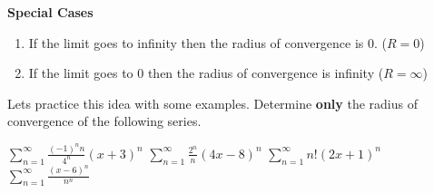 \documentclass[addpoints]{exam}
\begin{document}
\begin{tcolorbox}[title= RADIUS OF CONVERGENCE (CONT),colframe=black,sharp corners,colback=white,colbacktitle=white,coltitle=black]
    \large \textbf{Special Cases} \normalsize
    \begin{enumerate}
        \item If the limit goes to infinity then the radius of convergence is 0. (\(R=0\))
        \item If the limit goes to 0 then the radius of convergence is infinity (\(R=\infty\))
    \end{enumerate}
\end{tcolorbox}

Lets practice this idea with some examples. Determine \textbf{only} the radius of convergence of the following series. 
\begin{questions}
    \question \(\displaystyle
    \sum\limits_{n = 1}^\infty  {\frac{{{{\left( { - 1} \right)}^n}n}}{{{4^n}}}{{\left( {x + 3} \right)}^n}}
    \)
    \question \(\displaystyle
   \sum\limits_{n = 1}^\infty  {\frac{{{2^n}}}{n}{{\left( {4x - 8} \right)}^n}} 
    \)
    \question \(\displaystyle
   \sum\limits_{n = 1}^\infty n\textbf{!}\left(2x+1\right)^{n}
    \)
    \question \(\displaystyle
   \sum\limits_{n = 1}^\infty  {\frac{{{{\left( {x - 6} \right)}^n}}}{{{n^n}}}}
    \)
\end{questions}
\newpage
\end{document}
